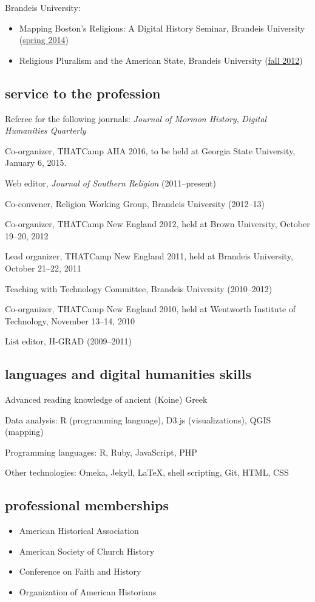 \documentclass[11pt]{article}
\providecommand{\tightlist}{%
  \setlength{\itemsep}{0pt}\setlength{\parskip}{0pt}}
\begin{document}
Brandeis University:

\begin{itemize}
\tightlist
\item
  Mapping Boston's Religions: A Digital History Seminar, Brandeis
  University (\href{/downloads/pdf/religion-19c-dh.pdf}{spring 2014})
\item
  Religious Pluralism and the American State, Brandeis University
  (\href{/downloads/pdf/religious-pluralism.syllabus.2012-fall.pdf}{fall
  2012})
\end{itemize}

\subsection{service to the profession}\label{service}

Referee for the following journals: \emph{Journal of Mormon History}, 
\emph{Digital Humanities Quarterly}

Co-organizer, THATCamp AHA 2016, to be held at Georgia State University,
January 6, 2015.

Web editor, \emph{Journal of Southern Religion} (2011--present)

Co-convener, Religion Working Group, Brandeis University (2012--13)

Co-organizer, THATCamp New England 2012, held at Brown University,
October 19--20, 2012

Lead organizer, THATCamp New England 2011, held at Brandeis University,
October 21--22, 2011

Teaching with Technology Committee, Brandeis University (2010--2012)

Co-organizer, THATCamp New England 2010, held at Wentworth Institute of
Technology, November 13--14, 2010

List editor, H-GRAD (2009--2011)

\subsection{languages and digital humanities
skills}\label{languages-and-digital-humanities-skills}

Advanced reading knowledge of ancient (Koine) Greek

Data analysis: R (programming language), D3.js (visualizations), QGIS
(mapping)

Programming languages: R, Ruby, JavaScript, PHP

Other technologies: Omeka, Jekyll, \LaTeX, shell scripting, Git, HTML,
CSS

\subsection{professional memberships}\label{professional-memberships}

\begin{itemize}
\item
  American Historical Association
\item
  American Society of Church History
\item
  Conference on Faith and History
\item
  Organization of American Historians
\end{itemize}
\end{document}
